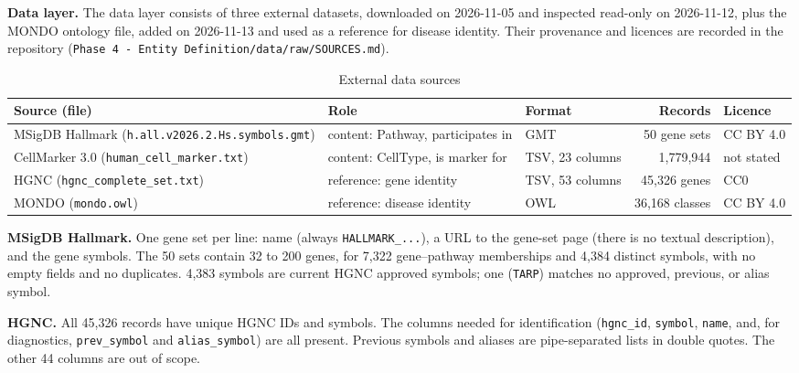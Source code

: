 \medskip\noindent\textbf{Data layer.} The data layer consists of three external datasets, downloaded on 2026-11-05 and inspected read-only on 2026-11-12, plus the MONDO ontology file, added on 2026-11-13 and used as a reference for disease identity. Their provenance and licences are recorded in the repository (\texttt{Phase 4 - Entity Definition/data/raw/SOURCES.md}).

\begin{table}[htbp]
\centering
\small
\begin{tabularx}{\linewidth}{|>{\raggedright\arraybackslash}X|l|l|r|l|}
\hline
\textbf{Source (file)} & \textbf{Role} & \textbf{Format} & \textbf{Records} & \textbf{Licence} \\ \hline
MSigDB Hallmark \cite{liberzon2015molecular} (\texttt{h.all.v2026.2.Hs.symbols.gmt}) & content: Pathway, participates in & GMT & 50 gene sets & CC BY 4.0 \\ \hline
CellMarker 3.0 \cite{hu2026cellmarker} (\texttt{human\_cell\_marker.txt}) & content: CellType, is marker for & TSV, 23 columns & 1,779,944 & not stated \\ \hline
HGNC \cite{seal2026genenames} (\texttt{hgnc\_complete\_set.txt}) & reference: gene identity & TSV, 53 columns & 45,326 genes & CC0 \\ \hline
MONDO \cite{vasilevsky2026mondo} (\texttt{mondo.owl}) & reference: disease identity & OWL & 36,168 classes & CC BY 4.0 \\ \hline
\end{tabularx}
\caption{External data sources}
\label{tab:sources}
\end{table}

\medskip\noindent\textbf{MSigDB Hallmark.} One gene set per line: name (always \texttt{HALLMARK\_...}), a URL to the gene-set page (there is no textual description), and the gene symbols. The 50 sets contain 32 to 200 genes, for 7,322 gene--pathway memberships and 4,384 distinct symbols, with no empty fields and no duplicates. 4,383 symbols are current HGNC approved symbols; one (\texttt{TARP}) matches no approved, previous, or alias symbol.

\medskip\noindent\textbf{HGNC.} All 45,326 records have unique HGNC IDs and symbols. The columns needed for identification (\texttt{hgnc\_id}, \texttt{symbol}, \texttt{name}, and, for diagnostics, \texttt{prev\_symbol} and \texttt{alias\_symbol}) are all present. Previous symbols and aliases are pipe-separated lists in double quotes. The other 44 columns are out of scope.

